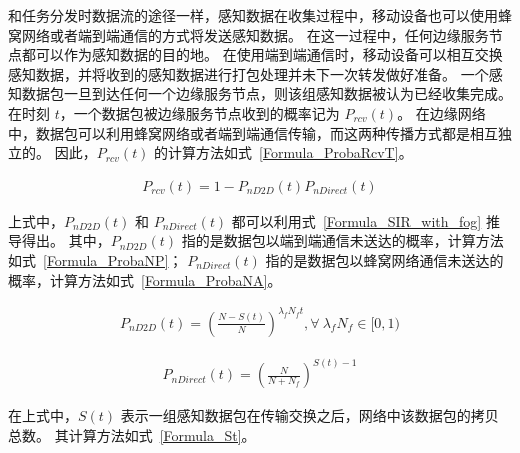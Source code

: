 
和任务分发时数据流的途径一样，感知数据在收集过程中，移动设备也可以使用蜂窝网络或者端到端通信的方式将发送感知数据。
在这一过程中，任何边缘服务节点都可以作为感知数据的目的地。
在使用端到端通信时，移动设备可以相互交换感知数据，并将收到的感知数据进行打包处理并未下一次转发做好准备。
一个感知数据包一旦到达任何一个边缘服务节点，则该组感知数据被认为已经收集完成。
在时刻 $t$，一个数据包被边缘服务节点收到的概率记为 $P_{rcv}(t)$。
在边缘网络中，数据包可以利用蜂窝网络或者端到端通信传输，而这两种传播方式都是相互独立的。
因此，$P_{rcv}(t)$ 的计算方法如式~\eqref{Formula_ProbaRcvT}。

\begin{equation}
\label{Formula_ProbaRcvT}
\begin{aligned}
P_{rcv}(t) = 1 - P_{nD2D}(t) P_{nDirect}(t)
\end{aligned}
\end{equation}

上式中，$P_{nD2D}(t)$ 和 $P_{nDirect}(t)$ 都可以利用式~\eqref{Formula_SIR_with_fog} 推导得出。
其中，$P_{nD2D}(t)$ 指的是数据包以端到端通信未送达的概率，计算方法如式~\eqref{Formula_ProbaNP}；
$P_{nDirect}(t)$ 指的是数据包以蜂窝网络通信未送达的概率，计算方法如式~\eqref{Formula_ProbaNA}。

\begin{equation}
  \label{Formula_ProbaNP}
  \begin{aligned}
  P_{nD2D}(t) = (\frac{N-S(t)}{N})^{\lambda_f N_f t}, \forall \ \lambda_f N_f \in [0,1)
  \end{aligned}
\end{equation}

\begin{equation}
  \label{Formula_ProbaNA}
  \begin{aligned}
  P_{nDirect}(t) = (\frac{N}{N + N_f})^{S(t)-1}
  \end{aligned}
\end{equation}

在上式中，$S(t)$ 表示一组感知数据包在传输交换之后，网络中该数据包的拷贝总数。
其计算方法如式~\eqref{Formula_St}。

